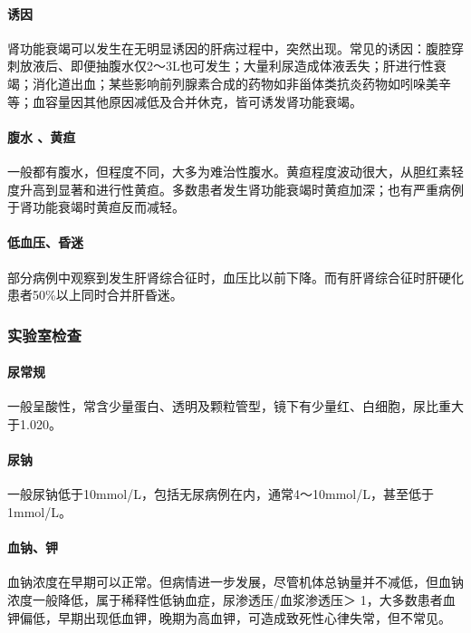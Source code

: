\paragraph{诱因}

肾功能衰竭可以发生在无明显诱因的肝病过程中，突然出现。常见的诱因：腹腔穿刺放液后、即便抽腹水仅2～3L也可发生；大量利尿造成体液丢失；肝进行性衰竭；消化道出血；某些影响前列腺素合成的药物如非甾体类抗炎药物如吲哚美辛等；血容量因其他原因减低及合并休克，皆可诱发肾功能衰竭。

\paragraph{腹水 、黄疸}

一般都有腹水，但程度不同，大多为难治性腹水。黄疸程度波动很大，从胆红素轻度升高到显著和进行性黄疸。多数患者发生肾功能衰竭时黄疸加深；也有严重病例于肾功能衰竭时黄疸反而减轻。

\paragraph{低血压、昏迷}

部分病例中观察到发生肝肾综合征时，血压比以前下降。而有肝肾综合征时肝硬化患者50\%以上同时合并肝昏迷。

\subsubsection{实验室检查}

\paragraph{尿常规}

一般呈酸性，常含少量蛋白、透明及颗粒管型，镜下有少量红、白细胞，尿比重大于1.020。

\paragraph{尿钠}

一般尿钠低于10mmol/L，包括无尿病例在内，通常4～10mmol/L，甚至低于1mmol/L。

\paragraph{血钠、钾}

血钠浓度在早期可以正常。但病情进一步发展，尽管机体总钠量并不减低，但血钠浓度一般降低，属于稀释性低钠血症，尿渗透压/血浆渗透压＞
1，大多数患者血钾偏低，早期出现低血钾，晚期为高血钾，可造成致死性心律失常，但不常见。

